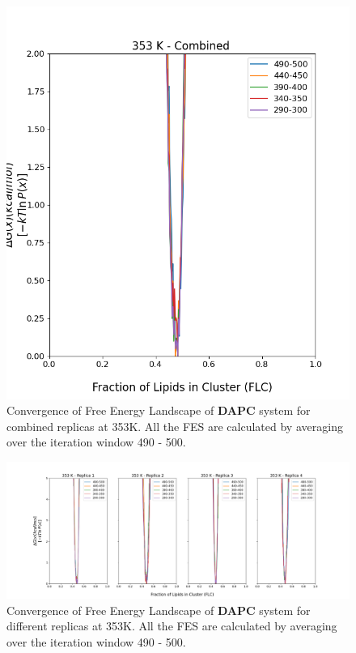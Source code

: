\documentclass{biophys-new}
\begin{document}
\begin{figure}[hbt!]
\centering
\includegraphics[width=0.6\linewidth]{all_plots/ClusterLipids2Total/DPPC_DAPC_CHOL/353K/Convergence_DAPC_MULTI__353_ClusterLipids2Total.png}
\caption{Convergence of Free Energy Landscape of \textbf{DAPC} system for combined replicas at 353K. All the FES are calculated by averaging over the iteration window 490 - 500.}
\label{fig:view}

\end{figure}

\begin{figure}[hbt!]
\centering
\includegraphics[width=1.1\linewidth]{all_plots/ClusterLipids2Total/DPPC_DAPC_CHOL/353K/Convergence_DAPC_353_ClusterLipids2Total.png}
\caption{Convergence of Free Energy Landscape of \textbf{DAPC} system for different replicas at 353K. All the FES are calculated by averaging over the iteration window 490 - 500.}
\label{fig:view}

\end{figure}
\end{document}
